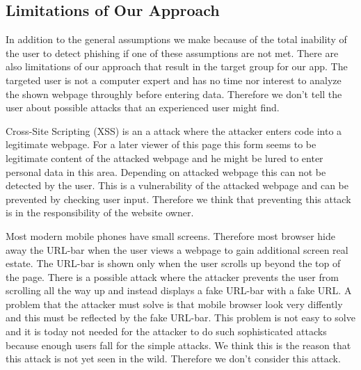 \subsection{Limitations of Our Approach}
In addition to the general assumptions we make because of the total inability of the user to detect phishing if one of these assumptions are not met.
There are also limitations of our approach that result in the target group for our app.
The targeted user is not a computer expert and has no time nor interest to analyze the shown webpage throughly before entering data.
Therefore we don't tell the user about possible attacks that an experienced user might find.
\begin{description}[leftmargin=0cm]
	\item[Cross-Site Scripting]
	Cross-Site Scripting (XSS) is an a attack where the attacker enters code into a legitimate webpage.
	For a later viewer of this page this form seems to be legitimate content of the attacked webpage and he might be lured to enter personal data in this area. 
	Depending on attacked webpage this can not be detected by the user.
	This is a vulnerability of the attacked webpage and can be prevented by checking user input.
	Therefore we think that preventing this attack is in the responsibility of the website owner.
	\item[URL Hiding Techniques]
	Most modern mobile phones have small screens.
	Therefore most browser hide away the URL-bar when the user views a webpage to gain additional screen real estate.
	The URL-bar is shown only when the user scrolls up beyond the top of the page.
	There is a possible attack where the attacker prevents the user from scrolling all the way up and instead displays a fake URL-bar with a fake URL.
	A problem that the attacker must solve is that mobile browser look very diffently and this must be reflected by the fake URL-bar.
	This problem is not easy to solve and it is today not needed for the attacker to do such sophisticated attacks because enough users fall for the simple attacks. 
	We think this is the reason that this attack is not yet seen in the wild.
	Therefore we don't consider this attack. 
\end{description}

